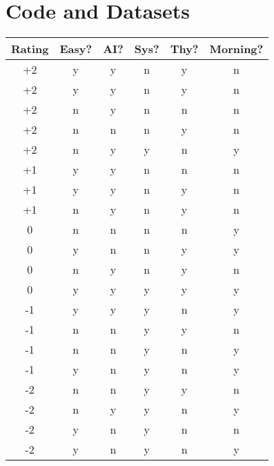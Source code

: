 
\chapter{Code and Datasets} \label{sec:data}


\begin{table*}
\begin{tabular}{c|ccccc}
{\bf Rating} &
{\bf Easy?} &
{\bf AI?} &
{\bf Sys?} &
{\bf Thy?} &
{\bf Morning?} \\
\hline
+2 & y  & y  & n  & y  & n  \\
+2 & y  & y  & n  & y  & n  \\
+2 & n  & y  & n  & n  & n  \\
+2 & n  & n  & n  & y  & n  \\
+2 & n  & y  & y  & n  & y  \\
+1 & y  & y  & n  & n  & n  \\
+1 & y  & y  & n  & y  & n  \\
+1 & n  & y  & n  & y  & n  \\
 0 & n  & n  & n  & n  & y  \\
 0 & y  & n  & n  & y  & y  \\
 0 & n  & y  & n  & y  & n  \\
 0 & y  & y  & y  & y  & y  \\
\hline
-1 & y  & y  & y  & n  & y  \\
-1 & n  & n  & y  & y  & n  \\
-1 & n  & n  & y  & n  & y  \\
-1 & y  & n  & y  & n  & y  \\
-2 & n  & n  & y  & y  & n  \\
-2 & n  & y  & y  & n  & y  \\
-2 & y  & n  & y  & n  & n  \\
-2 & y  & n  & y  & n  & y  \\
\end{tabular}
\caption{Course rating data set}
\label{tab:data:course}
\end{table*}
